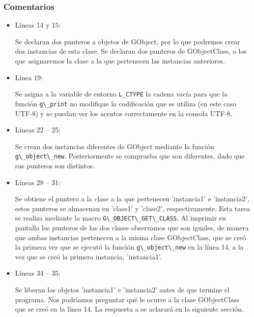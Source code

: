\subsubsection{Comentarios}
\begin{itemize}
\item Líneas 14 y 15:\par
  Se declaran dos punteros a objetos de \textsf{GObject}, por lo que podremos crear dos
  instancias de esta clase.
  Se declaran dos punteros de \textsf{GObjectClass}, a los que asignaremos la clase a la que pertenecen
  las instancias anteriores.
\item Línea 19:\par
  Se asigna a la variable de entorno \texttt{L\_CTYPE} la cadena vacía para que la función
  \passthrough{\lstinline!g\_print!} no modifique la codificación que se utiliza (en este caso UTF-8)
  y se puedan ver los acentos correctamente en la consola UTF-8.
\item Líneas 22 -- 25:\par
  Se crean dos instancias diferentes de \textsf{GObject} mediante la función 
  \passthrough{\lstinline!g\_object\_new!}. Posteriormente se comprueba que son diferentes, dado que
  sus punteros son distintos.
\item Líneas 28 -- 31:\par
  Se obtiene el puntero a la clase a la que pertenecen 'instancia1' e 'instancia2', estos punteros se
  almacenan en 'clase1' y 'clase2', respectivamente. Esta tarea se realiza mediante la macro
  \passthrough{\lstinline!G\_OBJECT\_GET\_CLASS!}. Al imprimir en pantalla los punteros de las
  dos clases observamos que son iguales, de manera que ambas instancias pertenecen a la misma
  clase \textsf{GObjectClass}, que se creó la primera vez que se ejecutó la función
  \passthrough{\lstinline!g\_object\_new!} en la línea 14, a la vez que se creó la primera instancia,
  'instancia1'.
\item Líneas 34 -- 35:\par
  Se liberan los objetos 'instancia1' e 'instancia2' antes de que termine el programa. Nos podríamos
  preguntar qué le ocurre a la clase \textsf{GObjectClass} que se creó en la línea 14. La respuesta a
  se aclarará en la siguiente sección.
\end{itemize}

